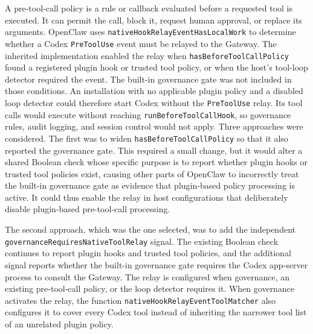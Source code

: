 A pre-tool-call policy is a rule or callback evaluated before a requested tool
is executed. It can permit the call, block it, request human approval, or
replace its arguments. OpenClaw uses
\texttt{nativeHookRelayEventHasLocalWork} to determine whether a Codex
\texttt{PreToolUse} event must be relayed to the Gateway. The inherited
implementation enabled the relay when \texttt{hasBeforeToolCallPolicy} found a
registered plugin hook or trusted tool policy, or when the host's tool-loop
detector required the event. The built-in governance gate was not included in
those conditions. An installation with no applicable plugin policy and a
disabled loop detector could therefore start Codex without the
\texttt{PreToolUse} relay. Its tool calls would execute without reaching
\texttt{runBeforeToolCallHook}, so governance rules, audit logging, and session
control would not apply.
Three approaches were considered. The first was to widen
\texttt{hasBeforeToolCallPolicy} so that it also reported the governance gate.
This required a small change, but it would alter a shared Boolean check whose
specific purpose is to report whether plugin hooks or trusted tool policies
exist, causing other parts of OpenClaw to incorrectly treat the built-in
governance gate as evidence that plugin-based policy processing is active. It
could thus enable the relay in host configurations that deliberately
disable plugin-based pre-tool-call processing.

The second approach, which was the one selected, was to add the independent \texttt{governanceRequiresNativeToolRelay} signal.
The existing Boolean check continues to report plugin hooks and trusted tool
policies, and the additional signal reports whether the built-in governance
gate requires the Codex app-server process to consult the Gateway. The relay is
configured when governance, an existing pre-tool-call policy, or the loop
detector requires it. When governance activates the relay, the function
\texttt{nativeHookRelayEventToolMatcher} also configures it to cover every
Codex tool instead of inheriting the narrower tool list of an unrelated plugin
policy.

